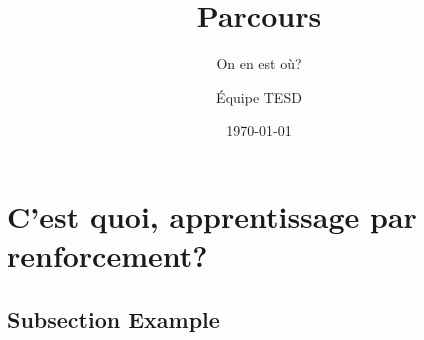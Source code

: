 \documentclass{beamer}
\title[Parcours, Août 2018]{Parcours} %
\subtitle{On en est où?}
\author{Équipe TESD} %
\institute[CRIM] %
{
CRIM \\ %
\medskip
\textit{prenom.nom@crim.ca} %
}
\date{\today} %
\begin{document}
\begin{frame}
\titlepage %
\end{frame}



\section{C'est quoi, apprentissage par renforcement?} %

\subsection{Subsection Example} %
\end{document}
